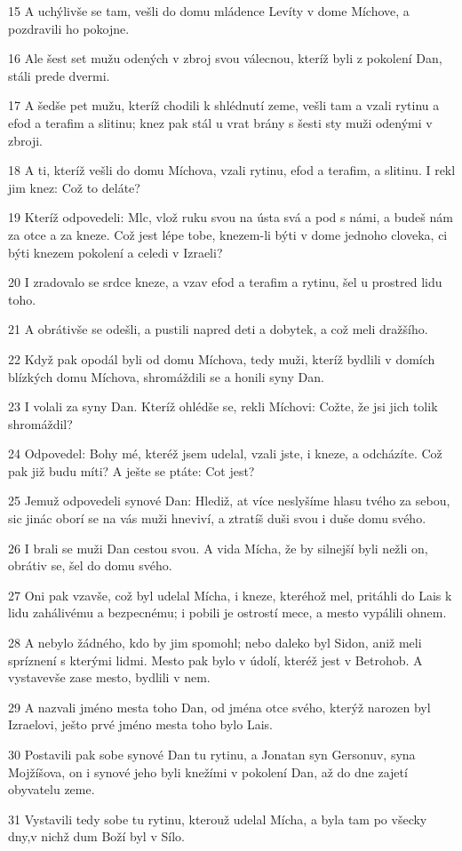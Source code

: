 \par 15 A uchýlivše se tam, vešli do domu mládence Levíty v dome Míchove, a pozdravili ho pokojne.
\par 16 Ale šest set mužu odených v zbroj svou válecnou, kteríž byli z pokolení Dan, stáli prede dvermi.
\par 17 A šedše pet mužu, kteríž chodili k shlédnutí zeme, vešli tam a vzali rytinu a efod a terafim a slitinu; knez pak stál u vrat brány s šesti sty muži odenými v zbroji.
\par 18 A ti, kteríž vešli do domu Míchova, vzali rytinu, efod a terafim, a slitinu. I rekl jim knez: Což to deláte?
\par 19 Kteríž odpovedeli: Mlc, vlož ruku svou na ústa svá a pod s námi, a budeš nám za otce a za kneze. Což jest lépe tobe, knezem-li býti v dome jednoho cloveka, ci býti knezem pokolení a celedi v Izraeli?
\par 20 I zradovalo se srdce kneze, a vzav efod a terafim a rytinu, šel u prostred lidu toho.
\par 21 A obrátivše se odešli, a pustili napred deti a dobytek, a což meli dražšího.
\par 22 Když pak opodál byli od domu Míchova, tedy muži, kteríž bydlili v domích blízkých domu Míchova, shromáždili se a honili syny Dan.
\par 23 I volali za syny Dan. Kteríž ohlédše se, rekli Míchovi: Cožte, že jsi jich tolik shromáždil?
\par 24 Odpovedel: Bohy mé, kteréž jsem udelal, vzali jste, i kneze, a odcházíte. Což pak již budu míti? A ješte se ptáte: Cot jest?
\par 25 Jemuž odpovedeli synové Dan: Hlediž, at více neslyšíme hlasu tvého za sebou, sic jinác oborí se na vás muži hneviví, a ztratíš duši svou i duše domu svého.
\par 26 I brali se muži Dan cestou svou. A vida Mícha, že by silnejší byli nežli on, obrátiv se, šel do domu svého.
\par 27 Oni pak vzavše, což byl udelal Mícha, i kneze, kteréhož mel, pritáhli do Lais k lidu zahálivému a bezpecnému; i pobili je ostrostí mece, a mesto vypálili ohnem.
\par 28 A nebylo žádného, kdo by jim spomohl; nebo daleko byl Sidon, aniž meli spríznení s kterými lidmi. Mesto pak bylo v údolí, kteréž jest v Betrohob. A vystavevše zase mesto, bydlili v nem.
\par 29 A nazvali jméno mesta toho Dan, od jména otce svého, kterýž narozen byl Izraelovi, ješto prvé jméno mesta toho bylo Lais.
\par 30 Postavili pak sobe synové Dan tu rytinu, a Jonatan syn Gersonuv, syna Mojžíšova, on i synové jeho byli knežími v pokolení Dan, až do dne zajetí obyvatelu zeme.
\par 31 Vystavili tedy sobe tu rytinu, kterouž udelal Mícha, a byla tam po všecky dny,v nichž dum Boží byl v Sílo.

